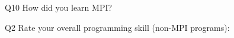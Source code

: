 \begin{description}%
\item{Q10} How did you learn MPI?%
\item{Q2} Rate your overall programming skill (non-MPI programs):%
\end{description}%
